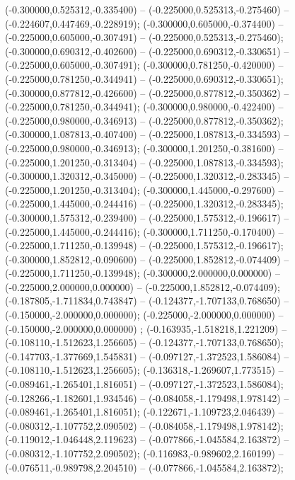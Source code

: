  (-0.300000,0.525312,-0.335400) -- (-0.225000,0.525313,-0.275460) -- (-0.224607,0.447469,-0.228919);
 (-0.300000,0.605000,-0.374400) -- (-0.225000,0.605000,-0.307491) -- (-0.225000,0.525313,-0.275460);
 (-0.300000,0.690312,-0.402600) -- (-0.225000,0.690312,-0.330651) -- (-0.225000,0.605000,-0.307491);
 (-0.300000,0.781250,-0.420000) -- (-0.225000,0.781250,-0.344941) -- (-0.225000,0.690312,-0.330651);
 (-0.300000,0.877812,-0.426600) -- (-0.225000,0.877812,-0.350362) -- (-0.225000,0.781250,-0.344941);
 (-0.300000,0.980000,-0.422400) -- (-0.225000,0.980000,-0.346913) -- (-0.225000,0.877812,-0.350362);
 (-0.300000,1.087813,-0.407400) -- (-0.225000,1.087813,-0.334593) -- (-0.225000,0.980000,-0.346913);
 (-0.300000,1.201250,-0.381600) -- (-0.225000,1.201250,-0.313404) -- (-0.225000,1.087813,-0.334593);
 (-0.300000,1.320312,-0.345000) -- (-0.225000,1.320312,-0.283345) -- (-0.225000,1.201250,-0.313404);
 (-0.300000,1.445000,-0.297600) -- (-0.225000,1.445000,-0.244416) -- (-0.225000,1.320312,-0.283345);
 (-0.300000,1.575312,-0.239400) -- (-0.225000,1.575312,-0.196617) -- (-0.225000,1.445000,-0.244416);
 (-0.300000,1.711250,-0.170400) -- (-0.225000,1.711250,-0.139948) -- (-0.225000,1.575312,-0.196617);
 (-0.300000,1.852812,-0.090600) -- (-0.225000,1.852812,-0.074409) -- (-0.225000,1.711250,-0.139948);
 (-0.300000,2.000000,0.000000) -- (-0.225000,2.000000,0.000000) -- (-0.225000,1.852812,-0.074409);
 (-0.187805,-1.711834,0.743847) -- (-0.124377,-1.707133,0.768650) -- (-0.150000,-2.000000,0.000000);
 (-0.225000,-2.000000,0.000000) -- (-0.150000,-2.000000,0.000000) ;
 (-0.163935,-1.518218,1.221209) -- (-0.108110,-1.512623,1.256605) -- (-0.124377,-1.707133,0.768650);
 (-0.147703,-1.377669,1.545831) -- (-0.097127,-1.372523,1.586084) -- (-0.108110,-1.512623,1.256605);
 (-0.136318,-1.269607,1.773515) -- (-0.089461,-1.265401,1.816051) -- (-0.097127,-1.372523,1.586084);
 (-0.128266,-1.182601,1.934546) -- (-0.084058,-1.179498,1.978142) -- (-0.089461,-1.265401,1.816051);
 (-0.122671,-1.109723,2.046439) -- (-0.080312,-1.107752,2.090502) -- (-0.084058,-1.179498,1.978142);
 (-0.119012,-1.046448,2.119623) -- (-0.077866,-1.045584,2.163872) -- (-0.080312,-1.107752,2.090502);
 (-0.116983,-0.989602,2.160199) -- (-0.076511,-0.989798,2.204510) -- (-0.077866,-1.045584,2.163872);
